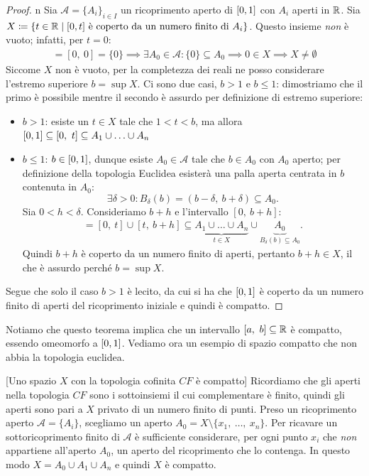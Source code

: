 \begin{proof}{n}
	Sia $\mathcal{A}=\{ A_i\}_{i\in I}$ un ricoprimento aperto di $\left[0, 1\right]$ con $A_i$ aperti in $\mathbb{R}$.
	Sia $X\coloneqq \{ t\in\mathbb{R} \mid [0,t] \text{ è coperto da un numero finito di } A_i \}$. Questo insieme \textit{non} è vuoto; infatti, per $t=0$:
		\begin{gather*}
			[0,\ t]=[0,\ 0]=\{0\}\implies\exists A_0\in\mathcal{A}\colon \{0\}\subseteq A_{0} \implies 0\in X\implies X\neq\emptyset
		\end{gather*}
	Siccome $X$ non è vuoto, per la completezza dei reali ne posso considerare l'estremo superiore $b=\sup X$. Ci sono due casi, $b>1$  e $b\leq 1$: dimostriamo che il primo è possibile mentre il secondo è assurdo per definizione di estremo superiore:
		\begin{itemize}
			\item $b>1$: esiste un $t\in X$ tale che $1<t<b$, ma allora$\left[0, 1\right]\subseteq [0,\ t] \subseteq A_1\cup \ldots \cup A_n$
			\item $b\leq 1$: $b\in \left[0, 1\right]$, dunque esiste $A_0\in\mathcal{A}$ tale che $b\in A_0$ con $A_0$ aperto; per definizione della topologia Euclidea esisterà una palla aperta centrata in $b$ contenuta in $A_0$:
			\begin{equation*}
				\exists \delta >0 \colon B_\delta (b)=(b-\delta, \ b+\delta )\subseteq A_0.
			\end{equation*}
			Sia $0<h<\delta$. Consideriamo $b+h$ e l'intervallo $[0,\ b+h]$:
				\begin{gather*}
					[0,\ b+h]=[0,\ t]\cup [t,\ b+h]\subseteq \underbrace{A_1\cup\ldots\cup A_n}_{t\in X}\cup \underbrace{A_0}_{B_\delta (b)\subseteq A_0}.
				\end{gather*}	
			Quindi $b+h$ è coperto da un numero finito di aperti, pertanto $b+h\in X$, il che è assurdo perché $b=\sup X$.
		\end{itemize}
	 Segue che solo il caso $b>1$ è lecito, da cui si ha che $\left[0, 1\right]$ è coperto da un numero finito di aperti del ricoprimento iniziale e quindi è compatto.\qedhere
\end{proof}
Notiamo che questo teorema implica che un intervallo $[a,\ b]\subseteq\mathbb{R}$ è compatto, essendo omeomorfo a $\left[0, 1\right]$. Vediamo ora un esempio di spazio compatto che non abbia la topologia euclidea.
\begin{example}{}[Uno spazio $X$ con la topologia cofinita {$CF$} è compatto]
	Ricordiamo che gli aperti nella topologia $CF$ sono i sottoinsiemi il cui complementare è finito, quindi gli aperti sono pari a $X$ privato di un numero finito di punti. Preso un ricoprimento aperto $\mathcal{A}=\{A_i\}$, scegliamo un aperto $A_0=X\setminus\{x_1,\ \ldots,\ x_n\}$. Per ricavare un sottoricoprimento finito di $\mathcal{A}$ è sufficiente considerare, per ogni punto $x_i$ che \textit{non} appartiene all'aperto $A_0$, un aperto del ricoprimento che lo contenga. In questo modo $X=A_0\cup A_1\cup A_n$ e quindi $X$ è compatto.
\end{example}
